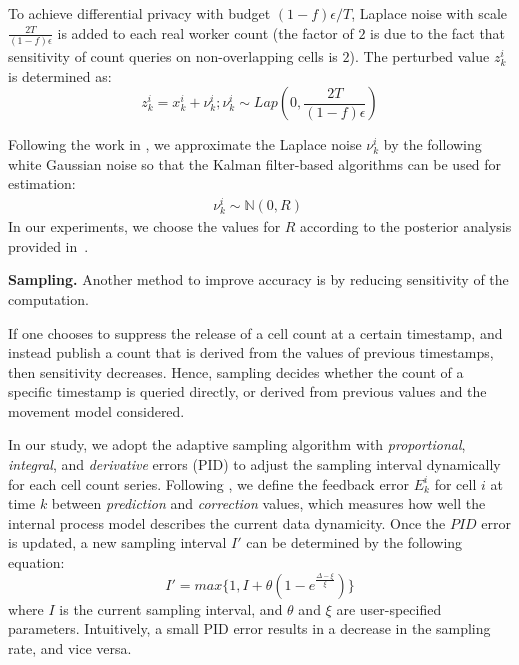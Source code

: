 \documentclass{USC-Thesis}
\numberwithin{equation}{chapter}
\begin{document}
To achieve differential privacy with budget $(1-f)\epsilon/T$, Laplace noise with scale $\frac{2T}{(1-f)\epsilon}$ is added to each real worker count (the factor of $2$ is due to the fact that sensitivity of count queries on non-overlapping cells is $2$). The perturbed value $z_k^i$ is determined as:
\begin{equation}
z_k^i = x_k^i + \nu_k^i ; \nu^i_k \sim Lap(0, \frac{2T}{(1-f)\epsilon}) 
\label{eq:measurement_model}
\end{equation}

Following the work in \cite{Fan14TKDE}, we approximate the Laplace noise $\nu_k^i$ by the following white Gaussian noise so that the Kalman filter-based algorithms can be used for estimation: 
\begin{align}
\nu^i_k \sim \mathbb{N}(0, R) \;
\end{align}
In our experiments, we choose the values for $R$ according to the posterior analysis provided in~\cite{Fan14TKDE}.


\noindent
\textbf{Sampling.} Another method to improve accuracy is by reducing sensitivity of the computation. 

If one chooses to suppress the release of a cell count at a certain timestamp, and instead publish a count that is derived from the values of previous timestamps, then sensitivity decreases. Hence, sampling decides whether the count of a specific timestamp is queried directly, or derived from previous values and the movement model considered. 

In our study, we adopt the adaptive sampling algorithm with \textit{proportional}, \textit{integral}, and \textit{derivative} errors (PID) to adjust the sampling interval dynamically for each cell count series. Following \cite{Fan14TKDE}, we define the feedback error $E_k^i$ for cell $i$ at time $k$ between \textit{prediction} and \textit{correction} values, which measures how well the internal process model describes the current data dynamicity.
  Once the $PID$ error is updated,  a new sampling interval $I'$ can be determined by the following equation:
\begin{equation}
I' = max\{1, I + \theta(1- e^{\frac{\Delta - \xi}{\xi}})\}
\end{equation} 
where $I$ is the current sampling interval, and $\theta$ and $\xi$ are user-specified parameters. 
  Intuitively, a small PID error results in a decrease in the sampling rate, and vice versa. 
\end{document}
